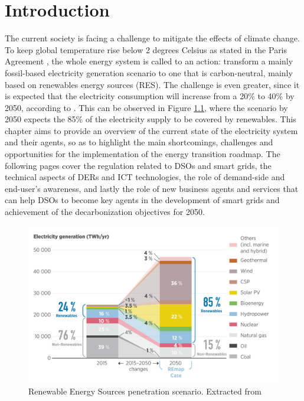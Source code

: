 \renewcommand\labelenumi{(\roman{enumi})}
\renewcommand\theenumi\labelenumi

\chapter{Introduction}
\label{chapterIntro}

The current society is facing a challenge to mitigate the effects of climate change. To keep global temperature rise below 2 degrees Celsius as stated in the Paris Agreement \cite{UnitedNations2015}, the whole energy system is called to an action: transform a mainly fossil-based electricity generation scenario to one that is carbon-neutral, mainly based on renewables energy sources (RES). The challenge is even greater, since it is expected that the electricity consumption will increase from a 20\% to 40\% by 2050, according to \cite{IRENA2018}. This can be observed in Figure \ref{fig:scenarios}, where the scenario by 2050 expects the 85\% of the electricity supply to be covered by renewables. This chapter aims to provide an overview of the current state of the electricity system and their agents, so as to highlight the main shortcomings, challenges and opportunities for the implementation of the energy transition roadmap. The following pages cover the regulation related to DSOs and smart grids, the technical aspects of DERs and ICT technologies, the role of demand-side and end-user's awareness, and lastly the role of new business agents and services that can help DSOs to become key agents in the development of smart grids and achievement of the decarbonization objectives for 2050. 


\begin{figure}[h]
	\centering 
	\includegraphics[width=1\columnwidth ]{ChapterIntro/Figures/irena_scenarios.png}
		\caption{Renewable Energy Sources penetration scenario. Extracted from \cite{IRENA2018}}  
		\label{fig:scenarios}
\end{figure}


